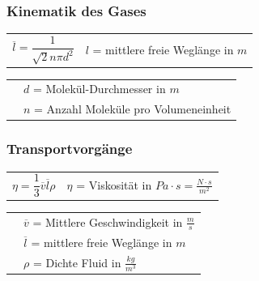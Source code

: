 		\subsubsection{Kinematik des Gases}
		\begin{minipage}[t]{13cm}
			\newline
			\renewcommand{\arraystretch}{2.5}
			\begin{tabular}{ p{3cm} | p{9cm}}
				$\overline{l} = \dfrac{1}{\sqrt{2}n\pi d^2}$	&	$l$ = mittlere freie Weglänge in $m$\\
			\end{tabular}
			\renewcommand{\arraystretch}{1.5}
			\begin{tabular}{ p{3cm} | p{9cm} }
				& $d$ = Molekül-Durchmesser in $m$\\
				& $n$ = Anzahl Moleküle pro Volumeneinheit\\
			\end{tabular} 
			\renewcommand{\arraystretch}{1}
		\end{minipage}
	
		\subsubsection{Transportvorgänge}
			\begin{minipage}{12cm}
					\newline
					\renewcommand{\arraystretch}{2.5}
					\begin{tabular}{ p{3cm} | p{7cm}}
						$\eta = \dfrac{1}{3} \overline{v} \overline{l} \rho$	&	$\eta$ = Viskosität in $Pa \cdot s = \frac{N \cdot s}{m^2}$\\
					\end{tabular}
					\renewcommand{\arraystretch}{1.5}
					\begin{tabular}{ p{3cm} | p{10cm} }
						& $\overline{v}$ = Mittlere Geschwindigkeit in $\frac{m}{s}$\\
						& $\overline{l}$ = mittlere freie Weglänge in $m$\\
						& $\rho$ = Dichte Fluid in $\frac{kg}{m^3}$\\
					\end{tabular} 
					\renewcommand{\arraystretch}{1}
			\end{minipage}
	\newpage
